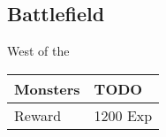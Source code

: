 \subsection{Battlefield}
\label{map:battlefield_17}

West of the 

\noindent\begin{tabularx}{\textwidth}[l]{lX}
	Monsters
	& TODO
\\ \hline
	Reward & 1200 Exp
\end{tabularx}
